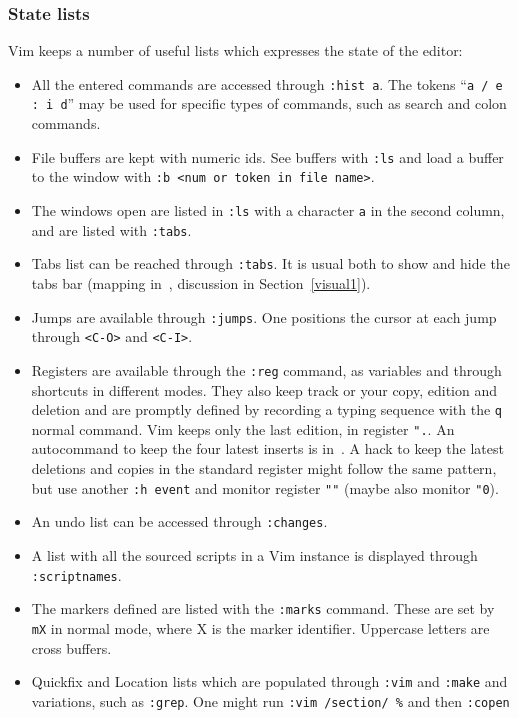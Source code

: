 \documentclass{article}
\newcommand{\ttt}[1] {
	\texttt{<#1>}}
\newcommand{\tttt}[1]{\texttt{#1}}
\begin{document}
\subsubsection{State lists}\label{state}
Vim keeps a number of useful lists which expresses the state of the editor:
\begin{itemize}
	\item All the entered commands are accessed through \tttt{:hist a}. 
    The tokens ``\tttt{a / e : i d}'' may be used for specific types of commands, such
		as search and colon commands.
	\item File buffers are kept with numeric ids. See buffers with \tttt{:ls} and load a buffer to the window with \tttt{:b <num or token in file name>}.
  \item The windows open are listed in \tttt{:ls} with a character \tttt{a} in the second column, and are listed with \tttt{:tabs}.
	\item Tabs list can be reached through \tttt{:tabs}.
		It is usual both to show and hide the tabs bar (mapping
    in~\cite{vimrc}, discussion in Section~\ref{visual1}).
	\item Jumps are available through \tttt{:jumps}.
		One positions the cursor at each jump through \ttt{C-O} and \ttt{C-I}.
  \item Registers are available through the \tttt{:reg} command, as variables and through shortcuts in different modes.
    They also keep track or your copy, edition and deletion and are promptly defined
    by recording a typing sequence with the \tttt{q} normal command.
    Vim keeps only the last edition, in register \tttt{".}.
    An autocommand to keep the four latest inserts is in~\cite{vimrc}.
    A hack to keep the latest deletions and copies in the standard register
    might follow the same pattern, but use another \tttt{:h event} and
    monitor register \tttt{""} (maybe also monitor \tttt{"0}).
	\item An undo list can be accessed through \tttt{:changes}.
	\item A list with all the sourced scripts in a Vim instance is displayed through \tttt{:scriptnames}.
	\item The markers defined are listed with the \tttt{:marks} command.
		These are set by \tttt{mX} in normal mode, where X is the marker identifier.
		Uppercase letters are cross buffers.
	\item Quickfix and Location lists which are populated through \tttt{:vim} and \tttt{:make}
		and variations, such as \tttt{:grep}.
		One might run \tttt{:vim /section/ \%} and then \tttt{:copen}

\end{itemize}
\end{document}
